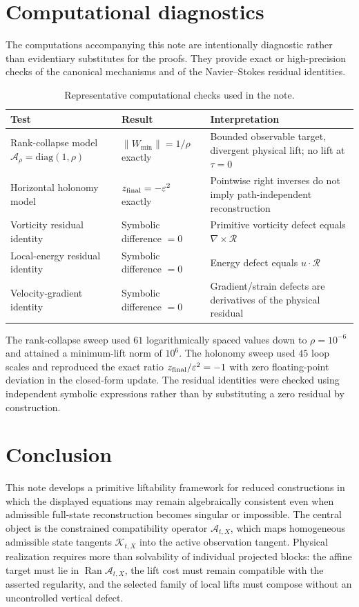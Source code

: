 \documentclass[12pt]{article}
\newcommand{\Rres}{\mathcal R}
\newcommand{\Ran}{\operatorname{Ran}}
\newcommand{\eps}{\varepsilon}
\newcommand{\Kt}{\mathcal K}
\newcommand{\Comp}{\mathscr A}
\begin{document}
\section{Computational diagnostics}
The computations accompanying this note are intentionally diagnostic rather than evidentiary substitutes for the proofs. They provide exact or high-precision checks of the canonical mechanisms and of the Navier--Stokes residual identities.

\begin{table}[H]
\centering
\caption{Representative computational checks used in the note.}
\begin{tabular}{p{}p{}p{}}
\toprule
Test & Result & Interpretation \\
\midrule
Rank-collapse model $\Comp_\rho=\mathrm{diag}(1,\rho)$ & $\|W_{\min}\|=1/\rho$ exactly & Bounded observable target, divergent physical lift; no lift at $\tau=0$ \\
Horizontal holonomy model & $z_{\rm final}=-\eps^2$ exactly & Pointwise right inverses do not imply path-independent reconstruction \\
Vorticity residual identity & Symbolic difference $=0$ & Primitive vorticity defect equals $\nabla\times\Rres$ \\
Local-energy residual identity & Symbolic difference $=0$ & Energy defect equals $u\cdot\Rres$ \\
Velocity-gradient identity & Symbolic difference $=0$ & Gradient/strain defects are derivatives of the physical residual \\
\bottomrule
\end{tabular}
\end{table}

The rank-collapse sweep used $61$ logarithmically spaced values down to $\rho=10^{-6}$ and attained a minimum-lift norm of $10^6$. The holonomy sweep used $45$ loop scales and reproduced the exact ratio $z_{\rm final}/\eps^2=-1$ with zero floating-point deviation in the closed-form update. The residual identities were checked using independent symbolic expressions rather than by substituting a zero residual by construction.


\section{Conclusion}
This note develops a primitive liftability framework for reduced constructions in which the displayed equations may remain algebraically consistent even when admissible full-state reconstruction becomes singular or impossible. The central object is the constrained compatibility operator $\Comp_{t,X}$, which maps homogeneous admissible state tangents $\Kt_{t,X}$ into the active observation tangent. Physical realization requires more than solvability of individual projected blocks: the affine target must lie in $\Ran\Comp_{t,X}$, the lift cost must remain compatible with the asserted regularity, and the selected family of local lifts must compose without an uncontrolled vertical defect.
\end{document}

